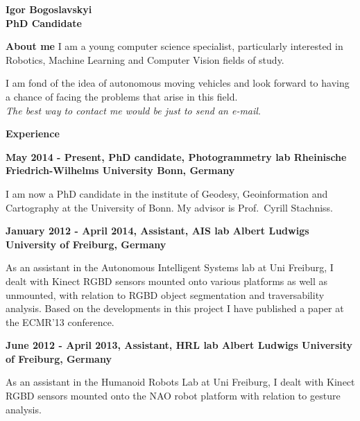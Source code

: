 \documentclass[a4paper,12pt,final]{memoir}
\newcommand{\Sep}{\vspace{1.5em}}
\newcommand{\SmallSep}{\vspace{0.5em}}
\newenvironment{AboutMe}
	{\ignorespaces\textbf{\color{Black} About me}}
	{\Sep\ignorespacesafterend}
\newcommand{\CVSection}[1]
	{\Large\textbf{#1}\par
	\SmallSep\normalsize\normalfont}
\newcommand{\CVItem}[1]
	{\textbf{\color{MidnightBlue} #1}}
\begin{document}
\Huge\bfseries {\color{MidnightBlue} Igor Bogoslavskyi} \\
\Large\bfseries  PhD Candidate \\

\normalsize\normalfont

\begin{AboutMe}
\newline
I am a young computer science specialist, particularly interested in Robotics, Machine Learning and Computer Vision fields of study.

I am fond of the idea of autonomous moving vehicles and look forward to having a chance of facing the problems that arise in this field. \\
\emph{The best way to contact me would be just to send an e-mail}.
\end{AboutMe}

\CVSection{Experience}
\CVItem{May 2014 - Present, PhD candidate, Photogrammetry lab
\newline Rheinische Friedrich-Wilhelms University Bonn, Germany}
\begin{compactitem}[\color{RoyalBlue}$\circ$]
\item I am now a PhD candidate in the institute of Geodesy, Geoinformation and Cartography at the University of Bonn. My advisor is Prof.~Cyrill Stachniss.
\end{compactitem}
\SmallSep

\CVItem{January 2012 - April 2014, Assistant, AIS lab
\newline Albert Ludwigs University of Freiburg, Germany}
\begin{compactitem}[\color{RoyalBlue}$\circ$]
\item As an assistant in the Autonomous Intelligent Systems lab at Uni Freiburg, I dealt with Kinect RGBD sensors mounted onto various platforms as well as unmounted, with relation to RGBD object segmentation and traversability analysis. Based on the developments in this project I have published a paper at the ECMR'13 conference.
\end{compactitem}
\SmallSep

\CVItem{June 2012 - April 2013, Assistant, HRL lab
\newline Albert Ludwigs University of Freiburg, Germany}
\begin{compactitem}[\color{RoyalBlue}$\circ$]
	\item As an assistant in the Humanoid Robots Lab at Uni Freiburg, I dealt with Kinect RGBD sensors mounted onto the NAO robot platform with relation to gesture analysis.
\end{compactitem}
\SmallSep
\end{document}
